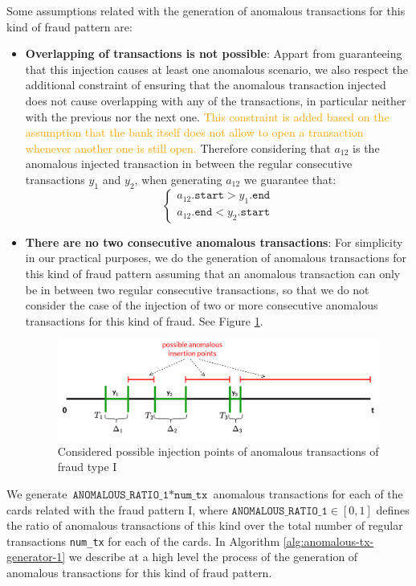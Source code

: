 Some assumptions related with the generation of anomalous transactions for this kind of fraud pattern are:
\begin{itemize}
  \item \textbf{Overlapping of transactions is not possible}:
  Appart from guaranteeing that this injection causes at least one anomalous scenario, we also respect the additional constraint of ensuring that the anomalous transaction injected does not cause overlapping with any of the transactions, in particular neither with the previous nor the next one. \textcolor{orange}{This constraint is added based on the assumption that the bank itself does not allow to open a transaction whenever another one is still open.} Therefore considering that $a_{12}$ is the anomalous injected transaction in between the regular consecutive transactions $y_1$ and $y_2$, when generating $a_{12}$ we guarantee that:
  $$
  \begin{cases}
    a_{12}.\texttt{start} > y_{1}.\texttt{end} \\
    a_{12}.\texttt{end} < y_{2}.\texttt{start}
  \end{cases}
  $$
  \item \textbf{There are no two consecutive anomalous transactions}: For simplicity in our practical purposes, we do the generation of anomalous transactions for this kind of fraud pattern assuming that an anomalous transaction can only be in between two regular consecutive transactions, so that we do not consider the case of the injection of two or more consecutive anomalous transactions for this kind of fraud. See Figure \ref{img:anomalous-type-1-insertion-points}.
  \begin{figure}[H]
    \centering
    \includegraphics[width=\textwidth]{images/1-DataModel/tx-generation-anomalous-1.png}
    \caption{Considered possible injection points of anomalous transactions of fraud type I}
    \label{img:anomalous-type-1-insertion-points}
  \end{figure}  
\end{itemize}

We generate $\texttt{ANOMALOUS\_RATIO\_1} * \texttt{num\_tx}$ anomalous transactions for each of the cards related with the fraud pattern I, where $\texttt{ANOMALOUS\_RATIO\_1} \in [0,1]$ defines the ratio of anomalous transactions of this kind over the total number of regular transactions \texttt{num\_tx} for each of the cards. In Algorithm \ref{alg:anomalous-tx-generator-1} we describe at a high level the process of the generation of anomalous transactions for this kind of fraud pattern. 


